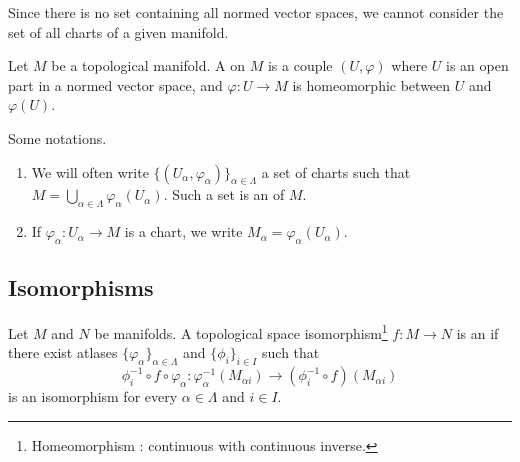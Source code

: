 \begin{normaltext}
	Since there is no set containing all normed vector spaces, we cannot consider the set of all charts of a given manifold.
\end{normaltext}

\begin{definition}		\label{DEFooKUJWooXHoCFI}
	Let \( M\) be a topological manifold. A  on \( M\) is a couple \( (U,\varphi)\) where \( U\) is an open part in a normed vector space, and \(\varphi \colon U\to M \) is homeomorphic between \( U\) and \( \varphi(U)\).
\end{definition}

\begin{normaltext}
	Some notations.
	\begin{enumerate}
		\item
		      We will often write \( \{ (U_{\alpha}, \varphi_{\alpha})\}_{\alpha\in \Lambda}\) a set of charts such that \( M=\bigcup_{\alpha\in \Lambda}\varphi_{\alpha}(U_{\alpha})\). Such a set is an  of \( M\).
		\item
		      If \(\varphi_{\alpha} \colon U_{\alpha}\to M  \) is a chart, we write \( M_{\alpha}=\varphi_{\alpha}(U_{\alpha})\).
	\end{enumerate}
\end{normaltext}

\subsection{Isomorphisms}

\begin{definition}	\label{DEFooZPUEooPcSxNs}
	Let \( M\) and \( N\) be manifolds. A topological space isomorphism\footnote{Homeomorphism : continuous with continuous inverse.} \(f \colon M\to N  \) is an  if there exist atlases \( \{ \varphi_{\alpha} \}_{\alpha\in \Lambda}\) and \( \{ \phi_i \}_{i\in I}\) such that
	\begin{equation}
		\phi_i^{-1}\circ f\circ \varphi_{\alpha} \colon \varphi_{\alpha}^{-1}(M_{\alpha i})\to(\phi_i^{-1}\circ f)(M_{\alpha i})
	\end{equation}
	is an isomorphism for every \( \alpha\in \Lambda\) and \( i\in I\).
\end{definition}

